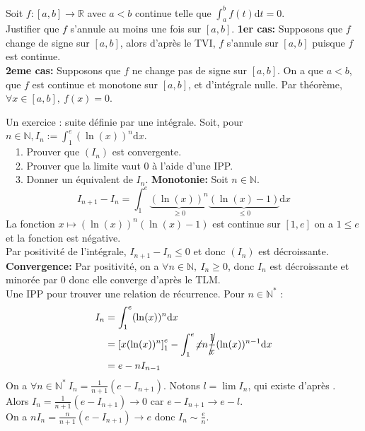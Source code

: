 \documentclass[11pt]{article}
\newcommand*{\R}{\mathbb{R}}
\newcommand*{\N}{\mathbb{N}}
\newcommand{\0}{\varnothing}
\newcommand{\dx}{\textrm{d}x}
\newcommand{\dt}{\textrm{d}t}
\begin{document}
\begin{ex}{}{}
    Soit $f:[a,b]\to\R$ avec $a<b$ continue telle que $\int_a^bf(t)\dt=0$.\\
    Justifier que $f$ s'annule au moins une fois sur $[a,b]$.
    \tcblower
    \textbf{1er cas:} Supposons que $f$ change de signe sur $[a,b]$, alors d'après le TVI, $f$ s'annule sur $[a,b]$ puisque $f$ est continue.\\
    \textbf{2eme cas:} Supposons que $f$ ne change pas de signe sur $[a,b]$. On a que $a<b$, que $f$ est continue et monotone sur $[a,b]$, et d'intégrale nulle. Par théorème, $\forall x \in [a,b], ~ f(x)=0$.
\end{ex}

\begin{ex}{Un exercice : suite définie par une intégrale.}{}
    Soit, pour $n\in\N, I_n := \int_1^e(\ln(x))^n\dx$.\\
    \-\ ~1. Prouver que $(I_n)$ est convergente.\\
    \-\ ~2. Prouver que la limite vaut 0 à l'aide d'une IPP.\\
    \-\ ~3. Donner un équivalent de $I_n$.
    \tcblower
     \textbf{Monotonie:} Soit $n\in\N$.
    \begin{equation*}
        I_{n+1} - I_n = \int_1^e\underbrace{(\ln(x))^n}_{\geq0}\underbrace{(\ln(x)-1)}_{\leq0}\dx
    \end{equation*}
    La fonction $x\mapsto (\ln(x))^n(\ln(x)-1)$ est continue sur $[1,e]$ on a $1\leq e$ et la fonction est négative.\\
    Par positivité de l'intégrale, $I_{n+1}-I_n\leq0$ et donc $(I_n)$ est décroissante.\\
    \textbf{Convergence:} Par positivité, on a $\forall n \in \N, ~ I_n \geq 0$, donc $I_n$ est décroissante et minorée par $0$ donc elle converge d'après le TLM.\\
     Une IPP pour trouver une relation de récurrence. Pour $n\in \N^*$ :
    \begin{align*}
        I_n &= \int_1^e(\ln(x))^n\dx\\&=\left[ x(\ln(x))^n \right]_1^e - \int_1^e\cancel{x}n\cancel{\frac{1}{x}}(\ln(x))^{n-1}\dx\\&=e-nI_{n-1}
    \end{align*}
    On a $\forall n \in \N^* ~ I_{n} = \frac{1}{n+1}(e-I_{n+1})$. Notons $l=\lim I_n$, qui existe d'après .\\
    Alors $I_n = \frac{1}{n+1}(e-I_{n+1})\to0$ car $e-I_{n+1}\to e - l$.\\
     On a $nI_n = \frac{n}{n+1}(e-I_{n+1})\to e$ donc $I_n \sim \frac{e}{n}$.
\end{ex}
\end{document}
